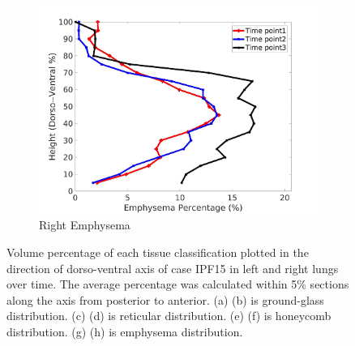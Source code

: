 \begin{figure}[H]
\begin{subfigure}{.42\linewidth}
  \includegraphics[width=\linewidth,trim={{.0\wd0} {.0\wd0} {.0\wd0} {.0\wd0}},clip]{Appendix/Image_AppexA/DorsoToVentral/IPF15RightLungEmphysemaDiseaseDorsoToVentral.jpg}
  \caption{Right Emphysema}
  \label{fig:IPF15DiseaseDorsoToVentral-h}
\end{subfigure}
\caption{Volume percentage of each tissue classification plotted in the direction of dorso-ventral axis of case IPF15 in left and right lungs over time. The average percentage was calculated within 5\% sections along the axis from posterior to anterior. (a) (b) is ground-glass distribution. (c) (d) is reticular distribution. (e) (f) is honeycomb distribution. (g) (h) is emphysema distribution.}
\label{fig:IPF15DiseaseDorsoToVentral}
\end{figure}

